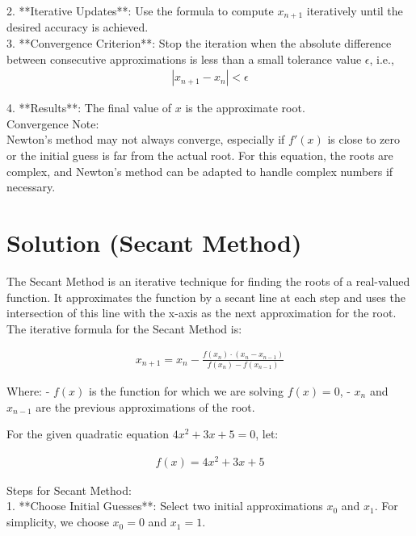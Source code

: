 \documentclass[journal]{IEEEtran}
\begin{document}
2. **Iterative Updates**: Use the formula to compute \( x_{n+1} \) iteratively until the desired accuracy is achieved.\\

3. **Convergence Criterion**: Stop the iteration when the absolute difference between consecutive approximations is less than a small tolerance value \( \epsilon \), i.e.,\\

\begin{align}
|x_{n+1} - x_n| < \epsilon
\end{align}

4. **Results**: The final value of \( x \) is the approximate root.\\

 Convergence Note:\\ 

Newton's method may not always converge, especially if \( f'(x) \) is close to zero or the initial guess is far from the actual root. For this equation, the roots are complex, and Newton's method can be adapted to handle complex numbers if necessary.


\section*{Solution (Secant Method)}

The Secant Method is an iterative technique for finding the roots of a real-valued function. It approximates the function by a secant line at each step and uses the intersection of this line with the x-axis as the next approximation for the root. The iterative formula for the Secant Method is:

\begin{align}
x_{n+1} = x_n - \frac{f(x_n) \cdot (x_n - x_{n-1})}{f(x_n) - f(x_{n-1})}
\end{align}

Where:
- \( f(x) \) is the function for which we are solving \( f(x) = 0 \),
- \( x_n \) and \( x_{n-1} \) are the previous approximations of the root.

For the given quadratic equation \( 4x^2 + 3x + 5 = 0 \), let:

\begin{align}
f(x) = 4x^2 + 3x + 5
\end{align}

 Steps for Secant Method:\\

1. **Choose Initial Guesses**: Select two initial approximations \( x_0 \) and \( x_1 \). For simplicity, we choose \( x_0 = 0 \) and \( x_1 = 1 \).\\
\end{document}
